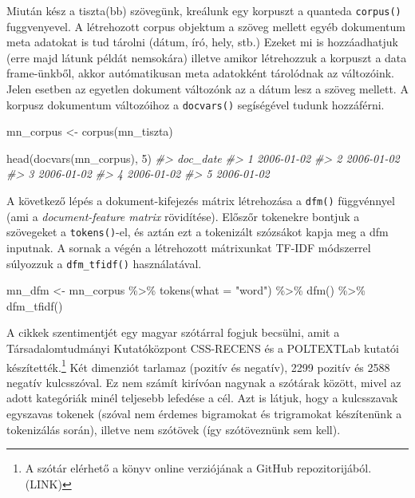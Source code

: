 \documentclass[
]{book}
\newenvironment{Shaded}{\begin{snugshade}}{\end{snugshade}}
\newcommand{\AttributeTok}[1]{\textcolor[rgb]{0.77,0.63,0.00}{#1}}
\newcommand{\CommentTok}[1]{\textcolor[rgb]{0.56,0.35,0.01}{\textit{#1}}}
\newcommand{\DecValTok}[1]{\textcolor[rgb]{0.00,0.00,0.81}{#1}}
\newcommand{\FunctionTok}[1]{\textcolor[rgb]{0.00,0.00,0.00}{#1}}
\newcommand{\NormalTok}[1]{#1}
\newcommand{\OtherTok}[1]{\textcolor[rgb]{0.56,0.35,0.01}{#1}}
\newcommand{\SpecialCharTok}[1]{\textcolor[rgb]{0.00,0.00,0.00}{#1}}
\newcommand{\StringTok}[1]{\textcolor[rgb]{0.31,0.60,0.02}{#1}}
\begin{document}
Miután kész a tiszta(bb) szövegünk, kreálunk egy korpuszt a quanteda
\texttt{corpus()} fuggvenyevel. A létrehozott corpus objektum a szöveg
mellett egyéb dokumentum meta adatokat is tud tárolni (dátum, író, hely,
stb.) Ezeket mi is hozzáadhatjuk (erre majd látunk példát nemsokára)
illetve amikor létrehozzuk a korpuszt a data frame-ünkből, akkor
autómatikusan meta adatokként tárolódnak az változóink. Jelen esetben az
egyetlen dokument változónk az a dátum lesz a szöveg mellett. A korpusz
dokumentum változóihoz a \texttt{docvars()} segíségével tudunk
hozzáférni.

\begin{Shaded}
\begin{Highlighting}[]
\NormalTok{mn\_corpus }\OtherTok{\textless{}{-}} \FunctionTok{corpus}\NormalTok{(mn\_tiszta)}

\FunctionTok{head}\NormalTok{(}\FunctionTok{docvars}\NormalTok{(mn\_corpus), }\DecValTok{5}\NormalTok{)}
\CommentTok{\#\textgreater{}     doc\_date}
\CommentTok{\#\textgreater{} 1 2006{-}01{-}02}
\CommentTok{\#\textgreater{} 2 2006{-}01{-}02}
\CommentTok{\#\textgreater{} 3 2006{-}01{-}02}
\CommentTok{\#\textgreater{} 4 2006{-}01{-}02}
\CommentTok{\#\textgreater{} 5 2006{-}01{-}02}
\end{Highlighting}
\end{Shaded}

A következő lépés a dokument-kifejezés mátrix létrehozása a
\texttt{dfm()} függvénnyel (ami a \emph{document-feature matrix}
rövidítése). Előszőr tokenekre bontjuk a szövegeket a
\texttt{tokens()}-el, és aztán ezt a tokenizált szózsákot kapja meg a
dfm inputnak. A sornak a végén a létrehozott mátrixunkat TF-IDF
módszerrel súlyozzuk a \texttt{dfm\_tfidf()} használatával.

\begin{Shaded}
\begin{Highlighting}[]
\NormalTok{mn\_dfm }\OtherTok{\textless{}{-}}\NormalTok{ mn\_corpus }\SpecialCharTok{\%\textgreater{}\%}
  \FunctionTok{tokens}\NormalTok{(}\AttributeTok{what =} \StringTok{"word"}\NormalTok{) }\SpecialCharTok{\%\textgreater{}\%}
  \FunctionTok{dfm}\NormalTok{() }\SpecialCharTok{\%\textgreater{}\%}
  \FunctionTok{dfm\_tfidf}\NormalTok{()}
\end{Highlighting}
\end{Shaded}

A cikkek szentimentjét egy magyar szótárral fogjuk becsülni, amit a
Társadalomtudmányi Kutatóközpont CSS-RECENS és a POLTEXTLab kutatói
készítették.\footnote{A szótár elérhető a könyv online verziójának a
  GitHub repozitorijából. (LINK)} Két dimenziót tarlamaz (pozitív és
negatív), 2299 pozitív és 2588 negatív kulcsszóval. Ez nem számít
kirívóan nagynak a szótárak között, mivel az adott kategóriák minél
teljesebb lefedése a cél. Azt is látjuk, hogy a kulcsszavak egyszavas
tokenek (szóval nem érdemes bigramokat és trigramokat készítenünk a
tokenizálás során), illetve nem szótövek (így szótöveznünk sem kell).
\end{document}
